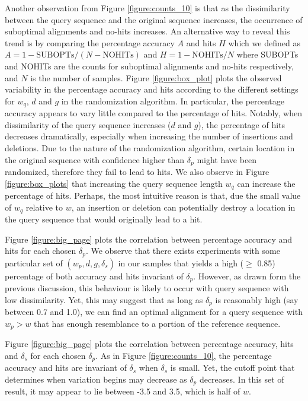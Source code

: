 \documentclass{article}
\begin{document}
Another observation from Figure \ref{figure:counts_10} is that as the dissimilarity between the query sequence and the original sequence increases, the occurrence of suboptimal alignments and no-hits increases. An alternative way to reveal this trend is by comparing the percentage accuracy $A$ and hits $H$ which we defined as $A = 1 - \mbox{SUBOPTs}/(N - \mbox{NOHITs})$ and $H = 1 - \mbox{NOHITs}/N$ where SUBOPTs and NOHITs are the counts for suboptimal alignments and no-hits respectively, and $N$ is the number of samples. Figure \ref{figure:box_plot} plots the observed variability in the percentage accuracy and hits according to the different settings for $w_q$,  $d$ and $g$ in the randomization algorithm. In particular, the percentage accuracy appears to vary little compared to the percentage of hits. Notably, when dissimilarity of the query sequence increases ($d$ and $g$), the percentage of hits decreases dramatically, especially when increasing the number of insertions and deletions. Due to the nature of the randomization algorithm, certain location in the original sequence with confidence higher than $\delta_p$ might have been randomized, therefore they fail to lead to hits. We also observe in Figure \ref{figure:box_plots} that increasing the query sequence length $w_q$ can increase the percentage of hits. Perhaps, the most intuitive reason is that, due the small value of $w_q$ relative to $w$, an insertion or deletion can potentially destroy a location in the query sequence that would originally lead to a hit. 

Figure \ref{figure:big_page} plots the correlation between percentage accuracy and hits for each chosen $\delta_p$. We observe that there exists experiments with some particular set of $(w_p, d, g, \delta_s)$ in our samples that yields a high ($\ge$ 0.85) percentage of both accuracy and hits invariant of $\delta_p$. However, as drawn form the previous discussion, this behaviour is likely to occur with query sequence with low dissimilarity. Yet, this may suggest that as long as $\delta_p$ is reasonably high (say between 0.7 and 1.0), we can find an optimal alignment for a query sequence with $w_p > w$ that has enough resemblance to a portion of the reference sequence.

Figure \ref{figure:big_page} plots the correlation between percentage accuracy, hits and $\delta_s$ for each chosen $\delta_p$. As in Figure \ref{figure:counts_10}, the percentage accuracy and hits are invariant of $\delta_s$ when $\delta_s$ is small. Yet, the cutoff point that determines when variation begins may decrease as $\delta_p$ decreases. In this set of result, it may appear to lie between -3.5 and 3.5, which is half of $w$. 
\end{document}
